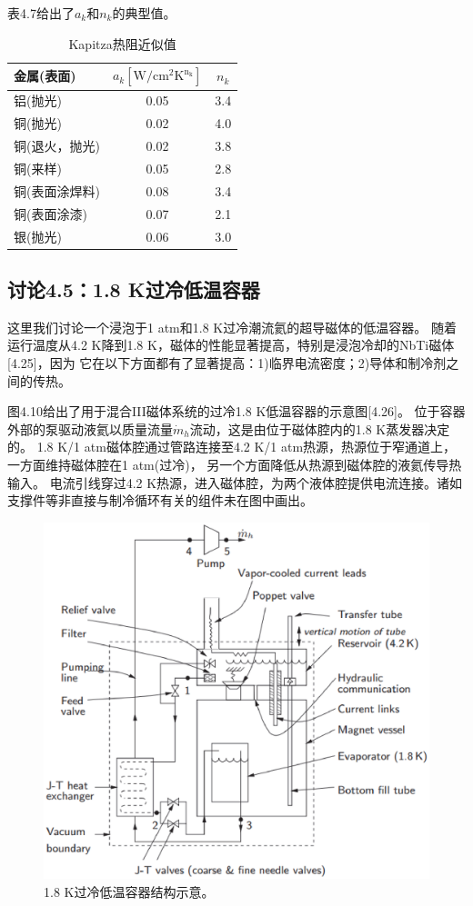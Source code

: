 表4.7给出了$a_k$和$n_k$的典型值。


\begin{table}[htbp]\small
 \centering
\caption{Kapitza热阻近似值}
	\begin{tabular}{|l|c|c|}
		\hline
金属(表面) & $a_k[\mathrm{W/cm^2K^{n_k}}]$ & $n_k$ \\ \hline
铝(抛光) & 0.05 & 3.4 \\ 
铜(抛光) & 0.02 & 4.0 \\
铜(退火，抛光) & 0.02 & 3.8 \\ 
铜(来样) & 0.05 & 2.8 \\ 
铜(表面涂焊料) & 0.08 & 3.4 \\ 
铜(表面涂漆) & 0.07 & 2.1 \\
银(抛光) & 0.06 & 3.0 \\ \hline
\end{tabular}
\end{table}


\subsection{讨论4.5：1.8 K过冷低温容器}
这里我们讨论一个浸泡于1 atm和1.8 K过冷潮流氦的超导磁体的低温容器。
随着运行温度从4.2 K降到1.8 K，磁体的性能显著提高，特别是浸泡冷却的NbTi磁体[4.25]，因为
它在以下方面都有了显著提高：1)临界电流密度；2)导体和制冷剂之间的传热。

图4.10给出了用于混合III磁体系统的过冷1.8 K低温容器的示意图[4.26]。
位于容器外部的泵驱动液氦以质量流量$\dot{m}_h$流动，这是由位于磁体腔内的1.8 K蒸发器决定的。
1.8 K/1 atm磁体腔通过管路连接至4.2 K/1 atm热源，热源位于窄通道上，一方面维持磁体腔在1 atm(过冷)，
另一个方面降低从热源到磁体腔的液氦传导热输入。
电流引线穿过4.2 K热源，进入磁体腔，为两个液体腔提供电流连接。诸如支撑件等非直接与制冷循环有关的组件未在图中画出。
\begin{figure}[htbp]
	\centering
	\includegraphics[scale=0.7]{chpt4/figs/fig4.10.eps}
	\caption{1.8 K过冷低温容器结构示意。}
\end{figure}

